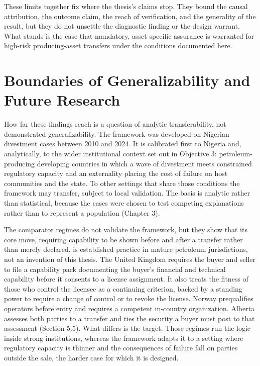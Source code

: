 \documentclass[twoside,fontset=lmodern]{mitthesis}
\begin{document}
These limits together fix where the thesis's claims stop. They bound the
causal attribution, the outcome claim, the reach of verification, and
the generality of the result, but they do not unsettle the diagnostic
finding or the design warrant. What stands is the case that mandatory,
asset-specific assurance is warranted for high-risk producing-asset
transfers under the conditions documented here.

\hypertarget{boundaries-of-generalizability-and-future-research}{%
\section{Boundaries of Generalizability and Future
Research}\label{boundaries-of-generalizability-and-future-research}}

How far these findings reach is a question of analytic transferability,
not demonstrated generalizability. The framework was developed on
Nigerian divestment cases between 2010 and 2024. It is calibrated first
to Nigeria and, analytically, to the wider institutional context set out
in Objective 3: petroleum-producing developing countries in which a wave
of divestment meets constrained regulatory capacity and an externality
placing the cost of failure on host communities and the state. To other
settings that share those conditions the framework may transfer, subject
to local validation. The basis is analytic rather than statistical,
because the cases were chosen to test competing explanations rather than
to represent a population (Chapter 3).

The comparator regimes do not validate the framework, but they show that
its core move, requiring capability to be shown before and after a
transfer rather than merely declared, is established practice in mature
petroleum jurisdictions, not an invention of this thesis. The United
Kingdom requires the buyer and seller to file a capability pack
documenting the buyer's financial and technical capability before it
consents to a license assignment. It also treats the fitness of those
who control the licensee as a continuing criterion, backed by a standing
power to require a change of control or to revoke the license. Norway
prequalifies operators before entry and requires a competent in-country
organization. Alberta assesses both parties to a transfer and ties the
security a buyer must post to that assessment (Section 5.5). What
differs is the target. Those regimes run the logic inside strong
institutions, whereas the framework adapts it to a setting where
regulatory capacity is thinner and the consequences of failure fall on
parties outside the sale, the harder case for which it is designed.
\end{document}
